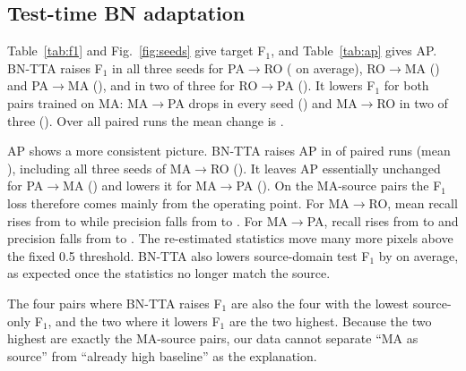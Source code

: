 \documentclass[pdflatex,sn-basic]{sn-jnl}
\newcommand{\BNTTA}{BN-TTA}
\newcommand{\Fone}{F$_1$}
\newcommand{\pr}[2]{#1$\to$#2}
\begin{document}
\subsection{Test-time BN adaptation}

Table~\ref{tab:f1} and Fig.~\ref{fig:seeds} give target \Fone{}, and Table~\ref{tab:ap} gives AP.
\BNTTA{} raises \Fone{} in all three seeds for \pr{PA}{RO} (\TTAPAROD{} on average), \pr{RO}{MA} (\TTAROMAD{}) and \pr{PA}{MA} (\TTAPAMAD{}), and in two of three for \pr{RO}{PA} (\TTAROPAD{}).
It lowers \Fone{} for both pairs trained on MA: \pr{MA}{PA} drops in every seed (\TTAMAPAD{}) and \pr{MA}{RO} in two of three (\TTAMAROD{}).
Over all \TTAAllN{} paired runs the mean change is \TTAAllD{}.

AP shows a more consistent picture.
\BNTTA{} raises AP in \TTAAPAllW{} of \TTAAPAllN{} paired runs (mean \TTAAPAllD{}), including all three seeds of \pr{MA}{RO} (\TTAAPMAROD{}).
It leaves AP essentially unchanged for \pr{PA}{MA} (\TTAAPPAMAD{}) and lowers it for \pr{MA}{PA} (\TTAAPMAPAD{}).
On the MA-source pairs the \Fone{} loss therefore comes mainly from the operating point.
For \pr{MA}{RO}, mean recall rises from \SORMAROM{} to \TTARMAROM{} while precision falls from \SOPMAROM{} to \TTAPMAROM{}.
For \pr{MA}{PA}, recall rises from \SORMAPAM{} to \TTARMAPAM{} and precision falls from \SOPMAPAM{} to \TTAPMAPAM{}.
The re-estimated statistics move many more pixels above the fixed 0.5 threshold.
\BNTTA{} also lowers source-domain test \Fone{} by \TTASrcDropMean{} on average, as expected once the statistics no longer match the source.

The four pairs where \BNTTA{} raises \Fone{} are also the four with the lowest source-only \Fone{}, and the two where it lowers \Fone{} are the two highest.
Because the two highest are exactly the MA-source pairs, our data cannot separate ``MA as source'' from ``already high baseline'' as the explanation.

\begin{table}
\centering
\caption{Target-domain test \Fone{} (mean $\pm$ std over seeds 42, 123, 456). In parentheses: number of seeds in which the method beats source-only with the same seed. Bold: best mean per pair.}
\label{tab:f1}
\footnotesize\setlength{\tabcolsep}{4pt}
\end{table}

\begin{table}
\centering
\caption{Target-domain test average precision (AP), same layout as Table~\ref{tab:f1}.}
\label{tab:ap}
\footnotesize\setlength{\tabcolsep}{4pt}
\end{table}
\end{document}
